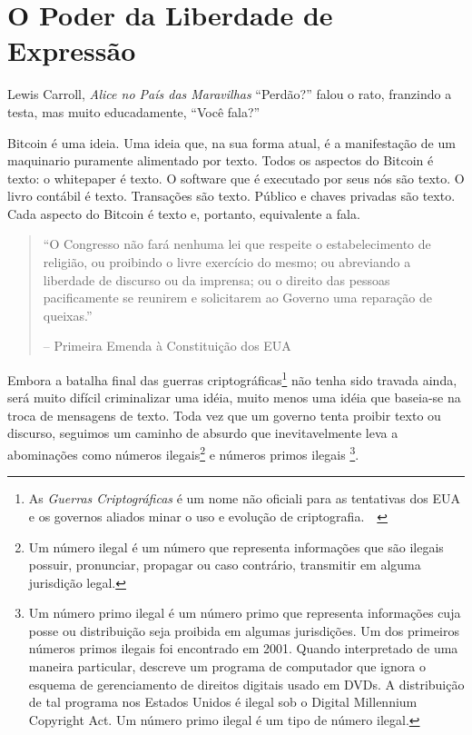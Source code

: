 \chapter{O Poder da Liberdade de Expressão}
\label{les:6}

\begin{chapquote}{Lewis Carroll, \textit{Alice no País das Maravilhas}}
\enquote{Perdão?} falou o rato, franzindo a testa, mas muito educadamente, \enquote{Você fala?}
\end{chapquote}

Bitcoin é uma ideia. Uma ideia que, na sua forma atual, é a
manifestação de um maquinario puramente alimentado por texto. Todos os aspectos do
Bitcoin é texto: o whitepaper é texto. O software que é executado por
seus nós são texto. O livro contábil é texto. Transações são texto. Público e
chaves privadas são texto. Cada aspecto do Bitcoin é texto e, portanto,
equivalente a fala.

\begin{quotation}\begin{samepage}
\enquote{O Congresso não fará nenhuma lei que respeite o estabelecimento de religião,
ou proibindo o livre exercício do mesmo; ou abreviando a liberdade de
discurso ou da imprensa; ou o direito das pessoas pacificamente se
reunirem e solicitarem ao Governo uma reparação de queixas.}
\begin{flushright} -- Primeira Emenda à Constituição dos EUA
\end{flushright}\end{samepage}\end{quotation}

Embora a batalha final das guerras criptográficas\footnote{As \textit{Guerras Criptográficas}
é um nome não oficiali para as tentativas dos EUA e os governos aliados minar o uso e evolução de 
criptografia.~\cite{eff-cryptowars}~\cite{wiki:cryptowars}} não tenha sido travada
ainda, será muito difícil criminalizar uma idéia, muito menos uma idéia que
baseia-se na troca de mensagens de texto. Toda vez que um governo tenta
proibir texto ou discurso, seguimos um caminho de absurdo que inevitavelmente leva
a abominações como números ilegais\footnote{Um número ilegal é um número que
representa informações que são ilegais possuir, pronunciar, propagar ou
caso contrário, transmitir em alguma jurisdição legal.\cite{wiki:illegal-number}} e números primos ilegais
\footnote{Um número primo ilegal é um número primo que representa
informações cuja posse ou distribuição seja proibida em algumas
jurisdições. Um dos primeiros números primos ilegais foi encontrado em 2001. Quando
interpretado de uma maneira particular, descreve um programa de computador que ignora
o esquema de gerenciamento de direitos digitais usado em DVDs. A distribuição de tal
programa nos Estados Unidos é ilegal sob o Digital Millennium Copyright
Act. Um número primo ilegal é um tipo de número ilegal.\cite{wiki:illegal-prime}}.

